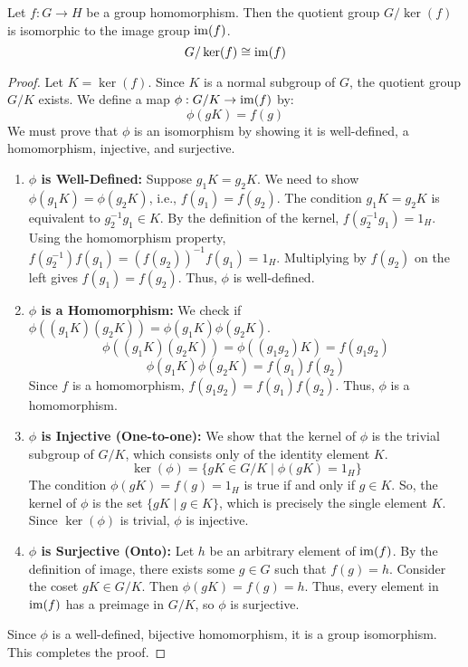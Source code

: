 \begin{theorem}
Let $f: G \to H$ be a group homomorphism. Then the quotient group $G/\ker(f)$ is isomorphic to the image group $\operatorname{im}(f)$.
\[ G/\ker(f) \cong \operatorname{im}(f) \]
\end{theorem}
\begin{proof}
Let $K = \ker(f)$. Since $K$ is a normal subgroup of $G$, the quotient group $G/K$ exists. We define a map $\phi: G/K \to \operatorname{im}(f)$ by:
\[
\phi(gK) = f(g)
\]
We must prove that $\phi$ is an isomorphism by showing it is well-defined, a homomorphism, injective, and surjective.
\begin{enumerate}
    \item \textbf{$\phi$ is Well-Defined:} Suppose $g_1K = g_2K$. We need to show $\phi(g_1K) = \phi(g_2K)$, i.e., $f(g_1) = f(g_2)$. The condition $g_1K=g_2K$ is equivalent to $g_2^{-1}g_1 \in K$. By the definition of the kernel, $f(g_2^{-1}g_1) = 1_H$. Using the homomorphism property, $f(g_2^{-1})f(g_1) = (f(g_2))^{-1}f(g_1) = 1_H$. Multiplying by $f(g_2)$ on the left gives $f(g_1) = f(g_2)$. Thus, $\phi$ is well-defined.

    \item \textbf{$\phi$ is a Homomorphism:} We check if $\phi((g_1K)(g_2K)) = \phi(g_1K)\phi(g_2K)$.
    \[ \phi((g_1K)(g_2K)) = \phi((g_1g_2)K) = f(g_1g_2) \]
    \[ \phi(g_1K)\phi(g_2K) = f(g_1)f(g_2) \]
    Since $f$ is a homomorphism, $f(g_1g_2) = f(g_1)f(g_2)$. Thus, $\phi$ is a homomorphism.

    \item \textbf{$\phi$ is Injective (One-to-one):} We show that the kernel of $\phi$ is the trivial subgroup of $G/K$, which consists only of the identity element $K$.
    \[ \ker(\phi) = \{ gK \in G/K \mid \phi(gK) = 1_H \} \]
    The condition $\phi(gK) = f(g) = 1_H$ is true if and only if $g \in K$.
    So, the kernel of $\phi$ is the set $\{gK \mid g \in K\}$, which is precisely the single element $K$. Since $\ker(\phi)$ is trivial, $\phi$ is injective.

    \item \textbf{$\phi$ is Surjective (Onto):} Let $h$ be an arbitrary element of $\operatorname{im}(f)$. By the definition of image, there exists some $g \in G$ such that $f(g) = h$. Consider the coset $gK \in G/K$. Then $\phi(gK) = f(g) = h$. Thus, every element in $\operatorname{im}(f)$ has a preimage in $G/K$, so $\phi$ is surjective.
\end{enumerate}
Since $\phi$ is a well-defined, bijective homomorphism, it is a group isomorphism. This completes the proof.
\end{proof}


